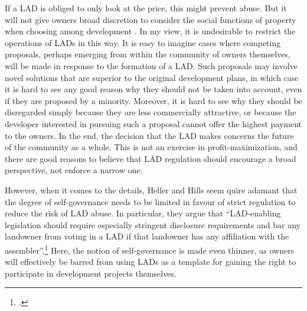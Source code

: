 If a LAD is obliged to only look at the price, this might prevent abuse. But it will not give owners broad discretion to consider the social functions of property when choosing among development . %
In my view, it is undesirable to restrict the operations of LADs in this way. It is easy to imagine cases where competing proposals, perhaps emerging from within the community of owners themselves, will be made in response to the formation of a LAD. Such proposals may involve novel solutions that are superior to the original development plans, in which case it is hard to see any good reason why they should not be taken into account, even if they are proposed by a minority. Moreover, it is hard to see why they should be disregarded simply because they are less commercially attractive, or because the  developer interested in pursuing such a proposal cannot offer the highest payment to the owners. In the end, the decision that the LAD makes concerns the future of the community as a whole. This is not an exercise in profit-maximization, and there are good reasons to believe that LAD regulation should encourage a broad perspective, not enforce a narrow one.

However, when it comes to the details, Heller and Hills seem quire adamant that the degree of self-governance needs to be limited in favour of strict regulation to reduce the risk of LAD abuse. In particular, they argue that ``LAD-enabling legislation should require especially stringent disclosure requirements and bar any landowner from voting in a LAD if that landowner has any affiliation with the assembler''.\footcite{heller08} Here, the notion of self-governance is made even thinner, as owners will effectively be barred from using LADs as a template for gaining the right to participate in development projects themselves.


